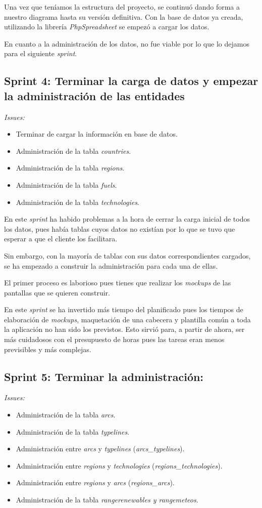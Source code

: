 Una vez que teníamos la estructura del proyecto, se continuó dando forma a nuestro diagrama hasta su versión definitiva. Con la base de datos ya creada, utilizando la librería \textit{PhpSpreadsheet} se empezó a cargar los datos.

En cuanto a la administración de los datos, no fue viable por lo que lo dejamos para el siguiente \textit{sprint}.

\subsection{Sprint 4: Terminar la carga de datos y empezar la administración de las entidades}
\textit{Issues:}
\begin{itemize}
	\item Terminar de cargar la información en base de datos.
	\item Administración de la tabla \textit{countries}.
	\item Administración de la tabla \textit{regions}.
	\item Administración de la tabla \textit{fuels}.
	\item Administración de la tabla \textit{technologies}.
\end{itemize}

En este \textit{sprint} ha habido problemas a la hora de cerrar la carga inicial de todos los datos, pues había tablas cuyos datos no existían por lo que se tuvo que esperar a que el cliente los facilitara.

Sin embargo, con la mayoría de tablas con sus datos correspondientes cargados, se ha empezado a construir la administración para cada una de ellas.

El primer proceso es laborioso pues tienes que realizar los \textit{mockups} de las pantallas que se quieren construir. 

En este \textit{sprint} se ha invertido más tiempo del planificado pues los tiempos de elaboración de \textit{mockups}, maquetación de una cabecera y plantilla común a toda la aplicación no han sido los previstos. Esto sirvió para, a partir de ahora, ser más cuidadosos con el presupuesto de horas pues las tareas eran menos previsibles y más complejas.

\subsection{Sprint 5: Terminar la administración:}
\textit{Issues:}
\begin{itemize}
	\item Administración de la tabla \textit{arcs}.
	\item Administración de la tabla \textit{typelines}.
	\item Administración entre \textit{arcs} y \textit{typelines} (\textit{arcs\_typelines}).
	\item Administración entre \textit{regions} y \textit{technologies} (\textit{regions\_technologies}).
	\item Administración entre \textit{regions} y \textit{arcs} (\textit{regions\_arcs}).
	\item Administración de la tabla \textit{rangerenewables y rangemeteos}.
\end{itemize}

